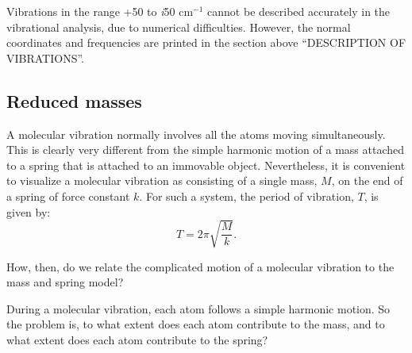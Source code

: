 Vibrations in the range +50 to {\em i}50 cm$^{-1}$ cannot be described
accurately in the vibrational analysis, due to numerical difficulties. However,
the normal coordinates and frequencies are printed in the section above
``DESCRIPTION OF VIBRATIONS''.

\subsection{Reduced masses}
A molecular vibration normally involves all the atoms moving simultaneously.
This is clearly very different from the  simple harmonic motion of a mass
attached to a spring that is attached to an immovable object.  Nevertheless, it
is convenient to visualize a molecular vibration as consisting of a single
mass, $M$, on the end of a spring of force constant $k$. For such a  system,
the period of vibration, $T$, is given by:
$$
T=2\pi\sqrt{\frac{M}{k}}.
$$

How, then, do we relate the complicated motion of a molecular vibration to the
mass and spring model?

During a molecular vibration, each atom follows a simple harmonic motion. So
the problem is, to what extent does each atom contribute to the mass, and to
what extent does each atom contribute to the spring?

